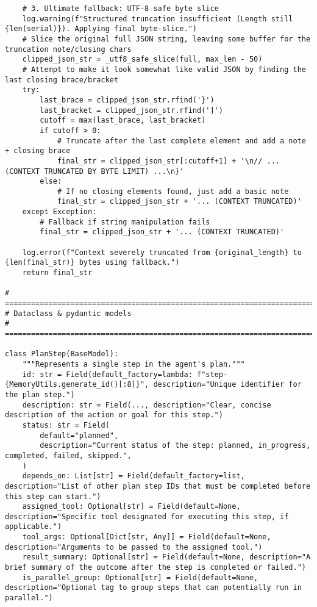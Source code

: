 \documentclass[12pt,a4paper]{article}
\begin{document}
\begin{pageablecode}
\begin{verbatim}
    # 3. Ultimate fallback: UTF-8 safe byte slice
    log.warning(f"Structured truncation insufficient (Length still {len(serial)}). Applying final byte-slice.")
    # Slice the original full JSON string, leaving some buffer for the truncation note/closing chars
    clipped_json_str = _utf8_safe_slice(full, max_len - 50)
    # Attempt to make it look somewhat like valid JSON by finding the last closing brace/bracket
    try:
        last_brace = clipped_json_str.rfind('}')
        last_bracket = clipped_json_str.rfind(']')
        cutoff = max(last_brace, last_bracket)
        if cutoff > 0:
            # Truncate after the last complete element and add a note + closing brace
            final_str = clipped_json_str[:cutoff+1] + '\n// ... (CONTEXT TRUNCATED BY BYTE LIMIT) ...\n}'
        else:
            # If no closing elements found, just add a basic note
            final_str = clipped_json_str + '... (CONTEXT TRUNCATED)'
    except Exception:
        # Fallback if string manipulation fails
        final_str = clipped_json_str + '... (CONTEXT TRUNCATED)'

    log.error(f"Context severely truncated from {original_length} to {len(final_str)} bytes using fallback.")
    return final_str

# ==========================================================================
# Dataclass & pydantic models
# ==========================================================================

class PlanStep(BaseModel):
    """Represents a single step in the agent's plan."""
    id: str = Field(default_factory=lambda: f"step-{MemoryUtils.generate_id()[:8]}", description="Unique identifier for the plan step.")
    description: str = Field(..., description="Clear, concise description of the action or goal for this step.")
    status: str = Field(
        default="planned",
        description="Current status of the step: planned, in_progress, completed, failed, skipped.",
    )
    depends_on: List[str] = Field(default_factory=list, description="List of other plan step IDs that must be completed before this step can start.")
    assigned_tool: Optional[str] = Field(default=None, description="Specific tool designated for executing this step, if applicable.")
    tool_args: Optional[Dict[str, Any]] = Field(default=None, description="Arguments to be passed to the assigned tool.")
    result_summary: Optional[str] = Field(default=None, description="A brief summary of the outcome after the step is completed or failed.")
    is_parallel_group: Optional[str] = Field(default=None, description="Optional tag to group steps that can potentially run in parallel.")



\end{verbatim}
\end{pageablecode}
\end{document}

